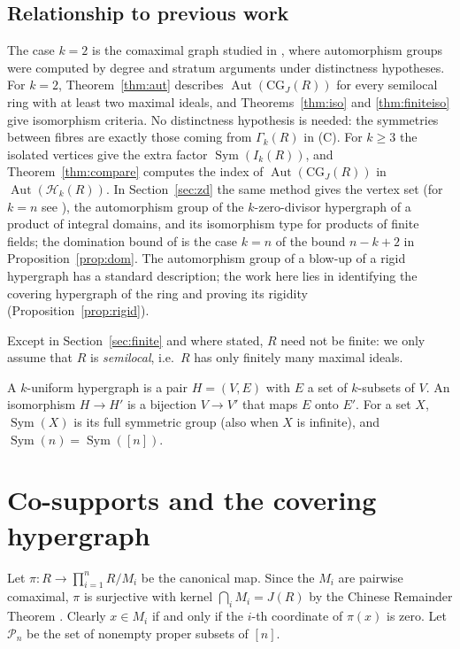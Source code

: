 \documentclass{amsart}
\theoremstyle{definition}
\theoremstyle{remark}
\newcommand{\Aut}{\operatorname{Aut}}
\newcommand{\Sym}{\operatorname{Sym}}
\newcommand{\CG}{\mathrm{CG}_J}
\newcommand{\cP}{\mathcal{P}}
\newcommand{\cH}{\mathcal{H}}
\newcommand{\nn}{[n]}
\begin{document}
\subsection*{Relationship to previous work}
The case $k=2$ is the comaximal graph studied in \cite{KMR25}, where automorphism groups were computed by degree and stratum arguments under distinctness hypotheses. For $k=2$, Theorem~\ref{thm:aut} describes $\Aut(\CG(R))$ for every semilocal ring with at least two maximal ideals, and Theorems~\ref{thm:iso} and \ref{thm:finiteiso} give isomorphism criteria. No distinctness hypothesis is needed: the symmetries between fibres are exactly those coming from $\Gamma_k(R)$ in (C). For $k\ge3$ the isolated vertices give the extra factor $\Sym(I_k(R))$, and Theorem~\ref{thm:compare} computes the index of $\Aut(\CG(R))$ in $\Aut(\cH_k(R))$. In Section~\ref{sec:zd} the same method gives the vertex set (for $k=n$ see \cite[Lemma~2.1]{MNR23}), the automorphism group of the $k$-zero-divisor hypergraph of a product of integral domains, and its isomorphism type for products of finite fields; the domination bound of \cite[Theorem~2.1]{MNR23} is the case $k=n$ of the bound $n-k+2$ in Proposition~\ref{prop:dom}. The automorphism group of a blow-up of a rigid hypergraph has a standard description; the work here lies in identifying the covering hypergraph of the ring and proving its rigidity (Proposition~\ref{prop:rigid}).

Except in Section~\ref{sec:finite} and where stated, $R$ need not be finite: we only assume that $R$ is \emph{semilocal}, i.e.\ $R$ has only finitely many maximal ideals.

A $k$-uniform hypergraph is a pair $H=(V,E)$ with $E$ a set of $k$-subsets of $V$. An isomorphism $H\to H'$ is a bijection $V\to V'$ that maps $E$ onto $E'$. For a set $X$, $\Sym(X)$ is its full symmetric group (also when $X$ is infinite), and $\Sym(n)=\Sym(\nn)$.

\section{Co-supports and the covering hypergraph}\label{sec:structure}

Let $\pi\colon R\to\prod_{i=1}^n R/M_i$ be the canonical map. Since the $M_i$ are pairwise comaximal, $\pi$ is surjective with kernel $\bigcap_i M_i=J(R)$ by the Chinese Remainder Theorem \cite[Proposition~1.10]{AM69}. Clearly $x\in M_i$ if and only if the $i$-th coordinate of $\pi(x)$ is zero. Let $\cP_n$ be the set of nonempty proper subsets of $\nn$.
\end{document}
